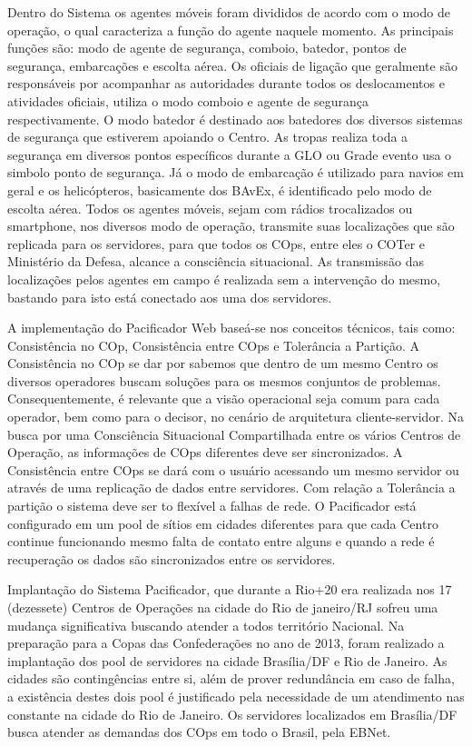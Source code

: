 \hspace{1.5cm}
Dentro do Sistema os agentes móveis foram divididos de acordo com o modo de operação, o qual caracteriza a função do agente naquele momento. As principais funções são: modo de agente de segurança, comboio, batedor, pontos de segurança, embarcações e escolta aérea. Os oficiais de ligação que geralmente são responsáveis por acompanhar as autoridades durante todos os deslocamentos e atividades oficiais, utiliza o modo comboio e agente de segurança respectivamente. O modo batedor é destinado aos batedores dos diversos sistemas de segurança que estiverem apoiando o Centro. As tropas realiza toda a segurança em diversos pontos específicos durante a GLO ou Grade evento usa o simbolo ponto de segurança. Já o modo de embarcação é utilizado para navios em geral e os helicópteros, basicamente dos BAvEx, é identificado pelo modo de escolta aérea. Todos os agentes móveis, sejam com rádios trocalizados ou smartphone, nos diversos modo de operação, transmite suas localizações que são replicada para os servidores, para que todos os COps, entre eles o COTer e Ministério da Defesa, alcance a consciência situacional. As transmissão das localizações pelos agentes em campo é realizada sem a intervenção do mesmo, bastando para isto está conectado aos uma dos servidores.

\hspace{1.5cm}
A implementação do Pacificador Web baseá-se nos conceitos técnicos, tais como: Consistência no COp, Consistência entre COps e Tolerância a Partição. A Consistência no COp se dar por sabemos que dentro de um mesmo Centro os diversos operadores buscam soluções para os mesmos conjuntos de problemas. Consequentemente, é relevante que a visão operacional seja comum para cada operador, bem como para o decisor, no cenário de arquitetura cliente-servidor. Na busca por uma Consciência Situacional Compartilhada entre os vários Centros de Operação, as informações de COps diferentes deve ser sincronizados. A Consistência entre COps se dará com o usuário acessando um mesmo servidor ou através de uma replicação de dados entre servidores. Com relação a Tolerância a partição o sistema deve ser to flexível a falhas de rede. O Pacificador está configurado em um pool de sítios em cidades diferentes para que cada Centro continue funcionando mesmo falta de contato entre alguns e quando a rede é recuperação os dados são sincronizados entre os servidores.

\hspace{1.5cm}
Implantação do Sistema Pacificador, que durante a Rio+20 era realizada nos 17 (dezessete) Centros de Operações na cidade do Rio de janeiro/RJ sofreu uma mudança significativa buscando atender a todos território Nacional. Na preparação para a Copas das Confederações no ano de 2013, foram realizado a implantação dos pool de servidores na cidade Brasília/DF e Rio de Janeiro. As cidades são contingências entre si, além de prover redundância em caso de falha, a existência destes dois pool é justificado pela necessidade de um atendimento nas constante na cidade do Rio de Janeiro. Os servidores localizados em Brasília/DF busca atender as demandas dos COps em todo o Brasil, pela EBNet.

